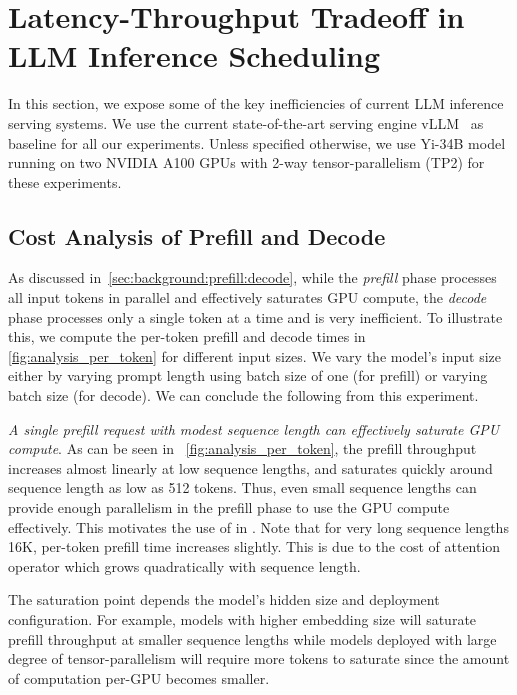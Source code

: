 \section{Latency-Throughput Tradeoff in LLM Inference Scheduling}
\label{sec:motivation}

In this section, we expose some of the key inefficiencies of current LLM inference serving systems. We use the current state-of-the-art serving engine vLLM~\cite{vllmsosp} as baseline for all our experiments. Unless specified otherwise, we use Yi-34B model running on two NVIDIA A100 GPUs with 2-way tensor-parallelism (TP2) for these experiments.


\subsection{Cost Analysis of Prefill and Decode}
\label{sec:analysis:throughput}



As discussed in~\autoref{sec:background:prefill:decode}, while the \textit{prefill} phase processes all input tokens in parallel and effectively saturates GPU compute, the \textit{decode} phase processes only a single token at a time and is very inefficient. To illustrate this, we compute the per-token prefill and decode times in \autoref{fig:analysis_per_token} for different input sizes. We vary the model's input size either by varying prompt length using batch size of one (for prefill) or varying batch size (for decode). We can conclude the following from this experiment.

 \textit{A single prefill request with modest sequence length can effectively saturate GPU compute}. As can be seen in ~\autoref{fig:analysis_per_token}, the prefill throughput increases almost linearly at low sequence lengths, and saturates quickly around sequence length as low as 512 tokens. Thus, even small sequence lengths can provide enough parallelism in the prefill phase to use the GPU compute effectively. This motivates the use of \chunking in \sysname.
Note that for very long sequence lengths \eg 16K, per-token prefill time increases slightly. This is due to the cost of attention operator which grows quadratically with sequence length.

The saturation point depends the model's hidden size and deployment configuration. For example, models with higher embedding size will saturate prefill throughput at smaller sequence lengths while models deployed with large degree of tensor-parallelism will require more tokens to saturate since the amount of computation per-GPU becomes smaller.


